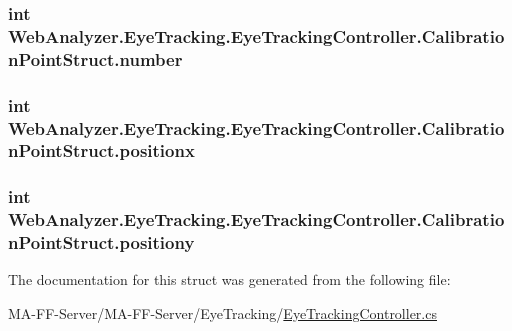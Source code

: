 \subsubsection[{number}]{\setlength{\rightskip}{0pt plus 5cm}int Web\+Analyzer.\+Eye\+Tracking.\+Eye\+Tracking\+Controller.\+Calibration\+Point\+Struct.\+number}\label{struct_web_analyzer_1_1_eye_tracking_1_1_eye_tracking_controller_1_1_calibration_point_struct_a25103a5b9edcc8a34d9e8a50603f42a7}
\hypertarget{struct_web_analyzer_1_1_eye_tracking_1_1_eye_tracking_controller_1_1_calibration_point_struct_a4594f134e46d973b06bb7f89bce6c1d7}{}
\subsubsection[{positionx}]{\setlength{\rightskip}{0pt plus 5cm}int Web\+Analyzer.\+Eye\+Tracking.\+Eye\+Tracking\+Controller.\+Calibration\+Point\+Struct.\+positionx}\label{struct_web_analyzer_1_1_eye_tracking_1_1_eye_tracking_controller_1_1_calibration_point_struct_a4594f134e46d973b06bb7f89bce6c1d7}
\hypertarget{struct_web_analyzer_1_1_eye_tracking_1_1_eye_tracking_controller_1_1_calibration_point_struct_a968184c62ffaaee0a01706b8052635dd}{}
\subsubsection[{positiony}]{\setlength{\rightskip}{0pt plus 5cm}int Web\+Analyzer.\+Eye\+Tracking.\+Eye\+Tracking\+Controller.\+Calibration\+Point\+Struct.\+positiony}\label{struct_web_analyzer_1_1_eye_tracking_1_1_eye_tracking_controller_1_1_calibration_point_struct_a968184c62ffaaee0a01706b8052635dd}


The documentation for this struct was generated from the following file\+:\begin{DoxyCompactItemize}
\item 
M\+A-\/\+F\+F-\/\+Server/\+M\+A-\/\+F\+F-\/\+Server/\+Eye\+Tracking/\hyperlink{_eye_tracking_controller_8cs}{Eye\+Tracking\+Controller.\+cs}\end{DoxyCompactItemize}
